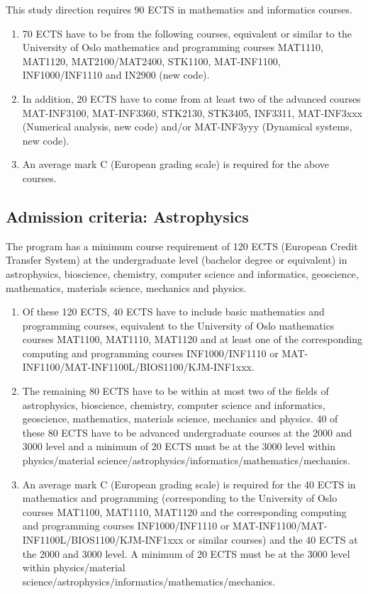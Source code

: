 \documentclass[%
oneside,                 %
final,                   %
10pt]{article}
\begin{document}
This study direction requires 90 ECTS in mathematics and informatics courses. 
\begin{enumerate}
\item 70 ECTS have to be from the following courses, equivalent or similar to the University of Oslo mathematics and programming courses MAT1110, MAT1120, MAT2100/MAT2400, STK1100, MAT-INF1100, INF1000/INF1110 and IN2900 (new code). 

\item In addition, 20 ECTS have to come from at least  two of the advanced courses MAT-INF3100, MAT-INF3360, STK2130, STK3405, INF3311, MAT-INF3xxx (Numerical analysis, new code) and/or MAT-INF3yyy (Dynamical systems, new code).

\item An average mark C (European grading scale) is required for the above courses.
\end{enumerate}

\noindent
\subsection*{Admission criteria: Astrophysics}
The program has a minimum course requirement of 120 ECTS (European Credit Transfer System) at the undergraduate level (bachelor degree or equivalent) in astrophysics, bioscience, chemistry, computer science and informatics, geoscience, mathematics, materials science, mechanics and physics. 
\begin{enumerate}
\item Of these 120 ECTS, 40 ECTS have to include basic mathematics and programming courses, equivalent to the University of Oslo mathematics courses MAT1100, MAT1110, MAT1120 and at least one of the corresponding computing and programming courses INF1000/INF1110 or MAT-INF1100/MAT-INF1100L/BIOS1100/KJM-INF1xxx. 

\item The remaining 80 ECTS have to be within at most two of the fields of astrophysics, bioscience, chemistry, computer science and informatics, geoscience, mathematics, materials science, mechanics and physics. 40 of these 80 ECTS have to be advanced undergraduate courses at the 2000 and 3000 level and a minimum of 20 ECTS must be at the 3000 level within physics/material science/astrophysics/informatics/mathematics/mechanics. 

\item An average mark C (European grading scale) is required for the 40 ECTS in mathematics and programming (corresponding  to the University of Oslo courses  MAT1100, MAT1110, MAT1120  and the corresponding computing and programming courses INF1000/INF1110 or MAT-INF1100/MAT-INF1100L/BIOS1100/KJM-INF1xxx or similar courses) and the 40 ECTS at the 2000 and 3000 level. A minimum of 20 ECTS must be at the 3000 level within physics/material science/astrophysics/informatics/mathematics/mechanics. 
\end{enumerate}
\end{document}
